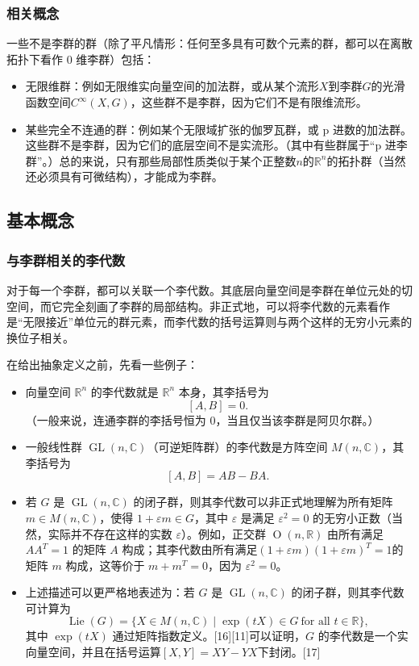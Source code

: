 \subsubsection{相关概念}
一些不是李群的群（除了平凡情形：任何至多具有可数个元素的群，都可以在离散拓扑下看作 0 维李群）包括：
\begin{itemize}
\item 无限维群：例如无限维实向量空间的加法群，或从某个流形$X$到李群$G$的光滑函数空间$C^{\infty}(X, G)$，这些群不是李群，因为它们不是有限维流形。
\item 某些完全不连通的群：例如某个无限域扩张的伽罗瓦群，或 p 进数的加法群。这些群不是李群，因为它们的底层空间不是实流形。（其中有些群属于“p 进李群”。）总的来说，只有那些局部性质类似于某个正整数$n$的$\mathbb{R}^n$的拓扑群（当然还必须具有可微结构），才能成为李群。
\end{itemize}
\subsection{基本概念}
\subsubsection{与李群相关的李代数}
对于每一个李群，都可以关联一个李代数。其底层向量空间是李群在单位元处的切空间，而它完全刻画了李群的局部结构。非正式地，可以将李代数的元素看作是“无限接近”单位元的群元素，而李代数的括号运算则与两个这样的无穷小元素的换位子相关。

在给出抽象定义之前，先看一些例子：
\begin{itemize}
\item 向量空间 $\mathbb{R}^n$ 的李代数就是 $\mathbb{R}^n$ 本身，其李括号为
  $$
  [A, B] = 0.~
  $$
  （一般来说，连通李群的李括号恒为 0，当且仅当该李群是阿贝尔群。）
\item 一般线性群 $\operatorname{GL}(n,\mathbb{C})$（可逆矩阵群）的李代数是方阵空间 $M(n,\mathbb{C})$，其李括号为
  $$
  [A, B] = AB - BA.~
  $$
\item 若 $G$ 是 $\operatorname{GL}(n,\mathbb{C})$ 的闭子群，则其李代数可以非正式地理解为所有矩阵 $m \in M(n,\mathbb{C})$，使得 $1 + \varepsilon m \in G$，其中 $\varepsilon$ 是满足 $\varepsilon^2 = 0$ 的无穷小正数（当然，实际并不存在这样的实数 $\varepsilon$）。例如，正交群 $\operatorname{O}(n,\mathbb{R})$ 由所有满足 $AA^{T} = 1$ 的矩阵 $A$ 构成；其李代数由所有满足$(1 + \varepsilon m)(1 + \varepsilon m)^{T} = 1$的矩阵 $m$ 构成，这等价于 $m + m^{T} = 0$，因为 $\varepsilon^{2} = 0$。
\item 上述描述可以更严格地表述为：若 $G$ 是 $\operatorname{GL}(n,\mathbb{C})$ 的闭子群，则其李代数可计算为
$$
\operatorname{Lie}(G) = \{ X \in M(n,\mathbb{C}) \mid \exp(tX) \in G \ \text{for all } t \in \mathbb{R} \},~
$$
其中 $\exp(tX)$ 通过矩阵指数定义。[16][11]可以证明，$G$ 的李代数是一个实向量空间，并且在括号运算$[X, Y] = XY - YX$下封闭。[17]
\end{itemize}